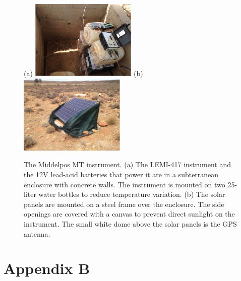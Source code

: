 \documentclass[draft,linenumbers]{agujournal2018}
\begin{document}
\begin{figure}[h]
  \centering
  (a)
  \includegraphics[width=0.45\textwidth]{figures/instrument.pdf}
  (b)
  \includegraphics[width=0.45\textwidth]{figures/solarpanel.pdf}
  \caption{The Middelpos MT instrument. (a) The LEMI-417 instrument and the 12V lead-acid batteries that power it are in a subterranean enclosure with concrete walls. The instrument is mounted on two 25-liter water bottles to reduce temperature variation. (b) The solar panels are mounted on a steel frame over the enclosure. The side openings are covered with a canvas to prevent direct sunlight on the instrument. The small white dome above the solar panels is the GPS antenna.}
  \label{fig:lemi}
\end{figure}


\clearpage
\section{Appendix B}
\label{appendix:tables}
\end{document}
